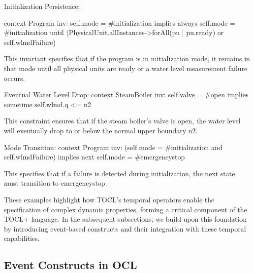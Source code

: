 Initialization Persistence:

context Program inv:
  self.mode = \#initialization implies
  always self.mode = \#initialization
  until (PhysicalUnit.allInstances->forAll(pu | pu.ready)
         or self.wlmdFailure)

This invariant specifies that if the program is in initialization mode, it remains in that mode until all physical units are ready or a water level measurement failure occurs.

Eventual Water Level Drop:
context SteamBoiler inv:
  self.valve = \#open implies sometime self.wlmd.q <= n2

This constraint ensures that if the steam boiler's valve is open, the water level will eventually drop to or below the normal upper boundary n2.

Mode Transition:
context Program inv:
  (self.mode = \#initialization and self.wlmdFailure)
  implies next self.mode = \#emergencystop

This specifies that if a failure is detected during initialization, the next state 
must transition to emergencystop.

These examples highlight how TOCL's temporal operators enable the specification of 
complex dynamic properties, forming a critical component of the TOCL+ language. 
In the subsequent subsections, we build upon this foundation by introducing 
event-based constructs and their integration with these temporal capabilities.

\subsection{Event Constructs in OCL}

